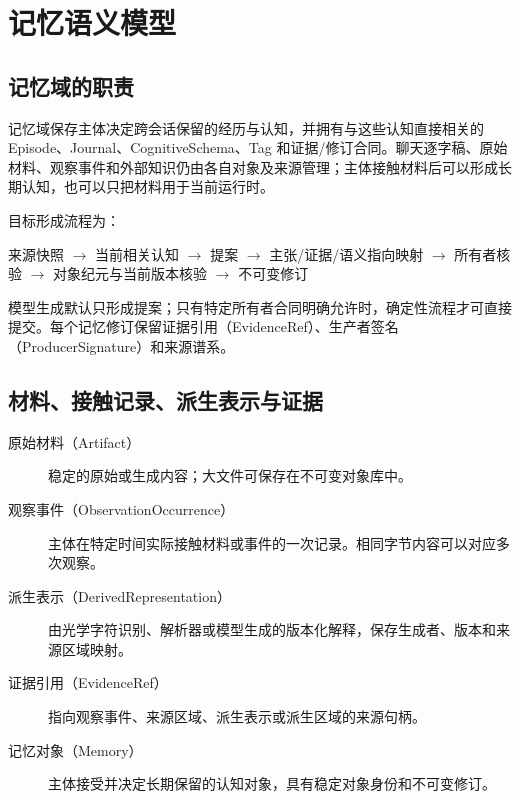 \chapter{记忆语义模型}

\section{记忆域的职责}

记忆域保存主体决定跨会话保留的经历与认知，并拥有与这些认知直接相关的 Episode、Journal、CognitiveSchema、Tag 和证据/修订合同。聊天逐字稿、原始材料、观察事件和外部知识仍由各自对象及来源管理；主体接触材料后可以形成长期认知，也可以只把材料用于当前运行时。\cite{nous-research-package}

目标形成流程为：

\begin{center}
\small
来源快照 $\rightarrow$ 当前相关认知 $\rightarrow$ 提案 $\rightarrow$ 主张/证据/语义指向映射 $\rightarrow$ 所有者核验 $\rightarrow$ 对象纪元与当前版本核验 $\rightarrow$ 不可变修订
\end{center}

模型生成默认只形成提案；只有特定所有者合同明确允许时，确定性流程才可直接提交。每个记忆修订保留证据引用（EvidenceRef）、生产者签名（ProducerSignature）和来源谱系。

\section{材料、接触记录、派生表示与证据}

\begin{description}
\item[原始材料（Artifact）] 稳定的原始或生成内容；大文件可保存在不可变对象库中。
\item[观察事件（ObservationOccurrence）] 主体在特定时间实际接触材料或事件的一次记录。相同字节内容可以对应多次观察。
\item[派生表示（DerivedRepresentation）] 由光学字符识别、解析器或模型生成的版本化解释，保存生成者、版本和来源区域映射。
\item[证据引用（EvidenceRef）] 指向观察事件、来源区域、派生表示或派生区域的来源句柄。
\item[记忆对象（Memory）] 主体接受并决定长期保留的认知对象，具有稳定对象身份和不可变修订。
\end{description}

